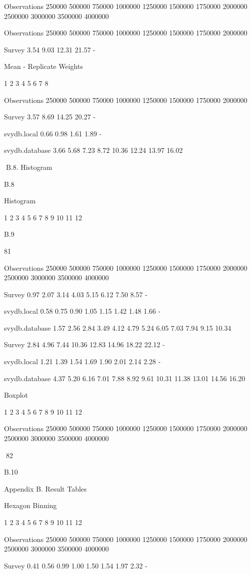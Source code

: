 Observations
250000
500000
750000
1000000
1250000
1500000
1750000
2000000
2500000
3000000
3500000
4000000

Observations
250000
500000
750000
1000000
1250000
1500000
1750000
2000000

Survey
3.54
9.03
12.31
21.57
-

Mean - Replicate Weights

1
2
3
4
5
6
7
8

Observations
250000
500000
750000
1000000
1250000
1500000
1750000
2000000

Survey
3.57
8.69
14.25
20.27
-

svydb.local
0.66
0.98
1.61
1.89
-

svydb.database
3.66
5.68
7.23
8.72
10.36
12.24
13.97
16.02

B.8. Histogram

B.8

Histogram

1
2
3
4
5
6
7
8
9
10
11
12

B.9

81

Observations
250000
500000
750000
1000000
1250000
1500000
1750000
2000000
2500000
3000000
3500000
4000000

Survey
0.97
2.07
3.14
4.03
5.15
6.12
7.50
8.57
-

svydb.local
0.58
0.75
0.90
1.05
1.15
1.42
1.48
1.66
-

svydb.database
1.57
2.56
2.84
3.49
4.12
4.79
5.24
6.05
7.03
7.94
9.15
10.34

Survey
2.84
4.96
7.44
10.36
12.83
14.96
18.22
22.12
-

svydb.local
1.21
1.39
1.54
1.69
1.90
2.01
2.14
2.28
-

svydb.database
4.37
5.20
6.16
7.01
7.88
8.92
9.61
10.31
11.38
13.01
14.56
16.20

Boxplot

1
2
3
4
5
6
7
8
9
10
11
12

Observations
250000
500000
750000
1000000
1250000
1500000
1750000
2000000
2500000
3000000
3500000
4000000

82

B.10

Appendix B. Result Tables

Hexagon Binning

1
2
3
4
5
6
7
8
9
10
11
12

Observations
250000
500000
750000
1000000
1250000
1500000
1750000
2000000
2500000
3000000
3500000
4000000

Survey
0.41
0.56
0.99
1.00
1.50
1.54
1.97
2.32
-

